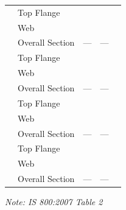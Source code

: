 \documentclass[12pt,a4paper]{report}
\numberwithin{table}{chapter}
\numberwithin{figure}{chapter}
\begin{document}
\begin{longtable}{|C{2.5cm}|L{3cm}|C{3.5cm}|C{2.5cm}|>{\centering\arraybackslash}p{4.0cm}|}
\hline
\endlastfoot
{} & Top Flange &  &  &  \\[6pt]
 & Web &  &  &  \\[6pt]
 & Overall Section & --- & --- &  \\[6pt]
\hline
{} & Top Flange &  &  &  \\[6pt]
 & Web &  &  &  \\[6pt]
 & Overall Section & --- & --- &  \\[6pt]
\hline
{} & Top Flange &  &  &  \\[6pt]
 & Web &  &  &  \\[6pt]
 & Overall Section & --- & --- &  \\[6pt]
\hline
{} & Top Flange &  &  &  \\[6pt]
 & Web &  &  &  \\[6pt]
 & Overall Section & --- & --- &  \\[6pt]
\hline
\end{longtable}
\noindent\textit{Note: IS 800:2007 Table 2}
\end{document}
